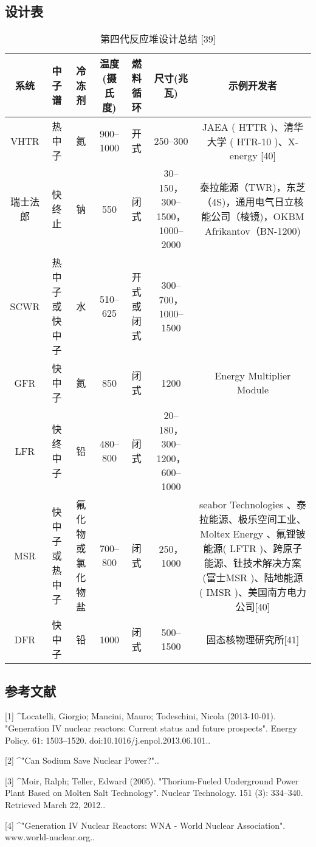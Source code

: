 \subsection{设计表}
\begin{table}[ht]
\centering
\caption{第四代反应堆设计总结 [39]}\label{FYD}
\begin{tabular}{|c|c|c|c|c|c|c}
\hline
\textbf{系统} & \textbf{中子谱} & \textbf{冷冻剂} & \textbf{温度(摄氏度)} & \textbf{燃料循环} & \textbf{尺寸(兆瓦)} & \textbf{示例开发者}\\
\hline
VHTR & 热中子 & 氦 & 900–1000 & 开式 & 250–300 & JAEA ( HTTR )、清华大学 ( HTR-10 )、X-energy [40]\\
\hline
瑞士法郎 & 快终止 & 钠 & 550 & 闭式 & 30–150，300–1500，1000–2000 & 泰拉能源（TWR)，东芝（4S)，通用电气日立核能公司（棱镜)，OKBM Afrikantov（BN-1200)\\
\hline
SCWR & 热中子或快中子 & 水 & 510–625 & 开式或闭式 & 300–700，1000–1500 & \\
\hline
GFR & 快中子 & 氦 & 850 & 闭式 & 1200 & Energy Multiplier Module\\
\hline
LFR & 快终中子 & 铅 & 480–800 & 闭式 & 20–180，300–1200，600–1000 & \\
\hline
MSR & 快中子或热中子 & 氟化物或氯化物盐 & 700–800 & 闭式 & 250，1000 & seabor Technologies 、泰拉能源、极乐空间工业、 Moltex Energy 、氟锂铍能源( LFTR )、跨原子能源、钍技术解决方案(富士MSR )、陆地能源 ( IMSR )、美国南方电力公司[40]\\
\hline
DFR & 快中子 & 铅 & 1000 & 闭式 & 500–1500 & 固态核物理研究所[41]\\
\hline
\end{tabular}
\end{table}

\subsection{参考文献}
[1]
^Locatelli, Giorgio; Mancini, Mauro; Todeschini, Nicola (2013-10-01). "Generation IV nuclear reactors: Current status and future prospects". Energy Policy. 61: 1503–1520. doi:10.1016/j.enpol.2013.06.101..

[2]
^"Can Sodium Save Nuclear Power?"..

[3]
^Moir, Ralph; Teller, Edward (2005). "Thorium-Fueled Underground Power Plant Based on Molten Salt Technology". Nuclear Technology. 151 (3): 334–340. Retrieved March 22, 2012..

[4]
^"Generation IV Nuclear Reactors: WNA - World Nuclear Association". www.world-nuclear.org..

